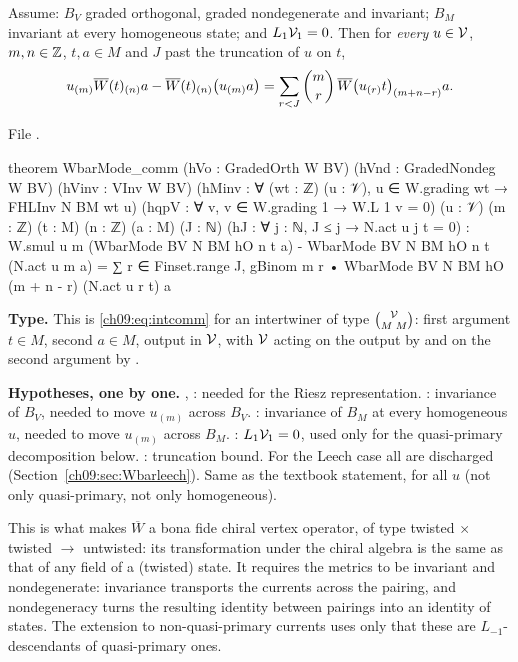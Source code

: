 \begin{theorem}\label{ch09:thm:Wbarcomm}
Assume: $B_V$ graded orthogonal, graded nondegenerate and invariant; $B_M$ invariant at every
homogeneous state; and $L_1\mathcal{V}_1=0$. Then for \emph{every} $u\in\mathcal{V}$, $m,n\in{\mathbb{Z}}$, $t,a\in M$
and $J$ past the truncation of $u$ on $t$,
\begin{equation}\label{ch09:eq:Wbarcomm}
u_{(m)}\overline{W}(t)_{(n)}a-\overline{W}(t)_{(n)}\big(u_{(m)}a\big)=\sum_{r<J}\binom mr\,\overline{W}\big(u_{(r)}t\big)_{(m+n-r)}a .
\end{equation}
\end{theorem}
\noindent File .
\begin{leancode}
theorem WbarMode_comm (hVo : GradedOrth W BV) (hVnd : GradedNondeg W BV) (hVinv : VInv W BV)
    (hMinv : ∀ (wt : ℤ) (u : 𝒱), u ∈ W.grading wt → FHLInv N BM wt u)
    (hqpV : ∀ v, v ∈ W.grading 1 → W.L 1 v = 0) (u : 𝒱) (m : ℤ) (t : M) (n : ℤ) (a : M)
    (J : ℕ) (hJ : ∀ j : ℕ, J ≤ j → N.act u j t = 0) :
    W.smul u m (WbarMode BV N BM hO n t a) - WbarMode BV N BM hO n t (N.act u m a)
      = ∑ r ∈ Finset.range J, gBinom m r • WbarMode BV N BM hO (m + n - r) (N.act u r t) a
\end{leancode}
\begin{dictionary}
\textbf{Type.} This is \eqref{ch09:eq:intcomm} for an intertwiner of type $\binom{\mathcal{V}}{M\;M}$:
first argument $t\in M$, second $a\in M$, output in $\mathcal{V}$, with $\mathcal{V}$ acting on the output by
 and on the second argument by .

\textbf{Hypotheses, one by one.} , : needed for the Riesz representation.
: invariance of $B_V$, needed to move $u_{(m)}$ across $B_V$. : invariance
of $B_M$ at every homogeneous $u$, needed to move $u_{(m)}$ across $B_M$. :
$L_1\mathcal{V}_1=0$, used only for the quasi-primary decomposition below. : truncation bound.
For the Leech case all are discharged (Section~\ref{ch09:sec:Wbarleech}). Same as the textbook
statement, for all $u$ (not only quasi-primary, not only homogeneous).
\end{dictionary}
\begin{physics}
This is what makes $\overline W$ a bona fide chiral vertex operator, of type twisted $\times$ twisted $\to$ untwisted: its transformation under the chiral algebra is the same as that of any field of a (twisted) state. It requires the metrics to be invariant and nondegenerate: invariance transports the currents across the pairing, and nondegeneracy turns the resulting identity between pairings into an identity of states. The extension to non-quasi-primary currents uses only that these are $L_{-1}$-descendants of quasi-primary ones.
\end{physics}

